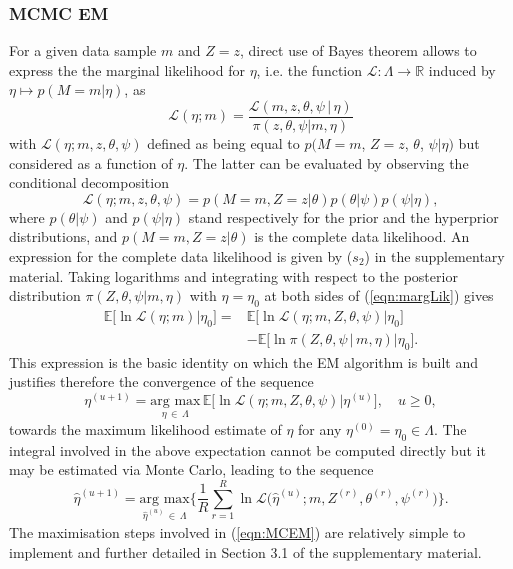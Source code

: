 \documentclass{bioinfo}
\begin{document}
\subsubsection{MCMC EM}\label{sec:MCMCEM}
For a given data sample $m$ and $Z = z$, direct use of Bayes theorem 
allows to  express the the marginal likelihood for $\eta$, i.e. the
function $\mathcal L: \Lambda \to \mathbb R$ induced by $\eta 
\mapsto p(M=m|\eta)$, as
\begin{equation}
  \label{eqn:margLik}
  \mathcal L(\eta; m) 
  = \frac{\mathcal L(m, z, \theta, \psi\,|\,\eta)}{\pi(z,
      \theta, \psi|m, \eta)}
\end{equation}
with $\mathcal L(\eta; m, z, \theta, \psi)$ 
defined as being equal to  $p(M=m$, $Z=z$, $\theta$,
$\psi|\eta)$ but considered as a function of $\eta$.  The latter
can be evaluated by observing the conditional decomposition
\[
   \mathcal L(\eta; m, z, \theta, \psi) 
  = 
   p(M=m, Z=z|\theta) p(\theta|\psi)p(\psi|\eta), 
\]
where $p(\theta|\psi)$ and $p(\psi|\eta)$ stand respectively for the
prior and the hyperprior distributions, and $p(M=m, Z=z|\theta)$ is the
complete data likelihood. An expression for the complete data
likelihood is given by ($s_2$) in the supplementary material. Taking
logarithms and integrating with respect to the posterior distribution
$\pi(Z, \theta, \psi|m, \eta)$ with $\eta = \eta_0$ at both sides of
(\ref{eqn:margLik}) gives 
\begin{align*}
   \mathbb E\big[\ln\mathcal L(\eta; m) \big| \eta_0\big] 
  =& 
  \mathbb E\big[\ln\mathcal L(\eta; m, Z, \theta, \psi)
    \big|  \eta_0\big]\\ 
  &-
  \mathbb E\big[\ln \pi(Z, \theta, \psi\,|\,m,\eta)\big| \eta_0\big].
\end{align*}  
This expression is the basic identity on which the EM algorithm is
built and justifies therefore the convergence of the sequence
\begin{equation}
 \label{eqn:EofMCEM}
  \eta^{(u+1)} = \underset{\eta\,\in\, \Lambda}{\text{arg max}}\, 
  \mathbb E\Big[\ln\mathcal L(\eta; m, Z, \theta, \psi)\big|
  \eta^{(u)}\Big], 
  \quad u\geq 0,
\end{equation}
towards the maximum likelihood estimate of $\eta$ for any $\eta^{(0)}
= \eta_0  \in \Lambda$. The integral involved in the above expectation
cannot be computed directly but it may be estimated via Monte Carlo,
leading to the sequence 
\begin{equation}
 \label{eqn:MCEM}
   \hat\eta^{(u+1)}
 = 
    \underset{\hat\eta^{(u)}\,\in\,\Lambda}{\text{arg max}} 
   \bigg\{
    \frac{1}{R}\sum_{r=1}^R 
      \ln\mathcal L\Big(\hat\eta^{(u)}; m, Z^{(r)}, \theta^{(r)},
      \psi^{(r)}\Big)
   \bigg\}.
\end{equation}
The maximisation steps involved in (\ref{eqn:MCEM}) are relatively
simple to implement and further detailed in Section 3.1 of the
supplementary material.
\end{document}
